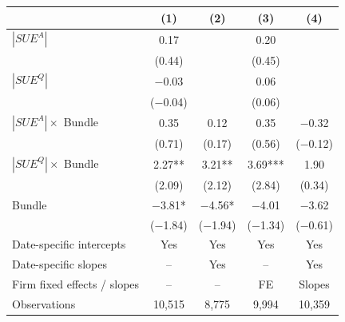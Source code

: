 \begin{tabular}{lcccc}
\toprule
 & (1) & (2) & (3) & (4)\\
\midrule
$|SUE^{A}|$ & 0.17 &  & 0.20 & \\
 & (0.44) &  & (0.45) & \\[1pt]
$|SUE^{Q}|$ & \ensuremath{-}0.03 &  & 0.06 & \\
 & (\ensuremath{-}0.04) &  & (0.06) & \\[1pt]
$|SUE^{A}|\times$ Bundle & 0.35 & 0.12 & 0.35 & \ensuremath{-}0.32\\
 & (0.71) & (0.17) & (0.56) & (\ensuremath{-}0.12)\\[1pt]
$|SUE^{Q}|\times$ Bundle & 2.27** & 3.21** & 3.69*** & 1.90\\
 & (2.09) & (2.12) & (2.84) & (0.34)\\[1pt]
Bundle & \ensuremath{-}3.81* & \ensuremath{-}4.56* & \ensuremath{-}4.01 & \ensuremath{-}3.62\\
 & (\ensuremath{-}1.84) & (\ensuremath{-}1.94) & (\ensuremath{-}1.34) & (\ensuremath{-}0.61)\\[1pt]
\midrule
Date-specific intercepts & Yes & Yes & Yes & Yes\\
Date-specific slopes & -- & Yes & -- & Yes\\
Firm fixed effects / slopes & -- & -- & FE & Slopes\\
Observations & 10,515 & 8,775 & 9,994 & 10,359\\
\bottomrule
\end{tabular}